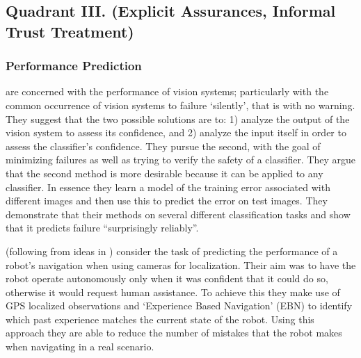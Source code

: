 \subsection{Quadrant III. (Explicit Assurances, Informal Trust Treatment)}\label{sec:q3}
\subsubsection{Performance Prediction}
    \citet{Zhang2014-he} are concerned with the performance of vision systems; particularly with the common occurrence of vision systems to failure `silently', that is with no warning. They suggest that the two possible solutions are to: 1) analyze the output of the vision system to assess its confidence, and 2) analyze the input itself in order to assess the classifier's confidence. They pursue the second, with the goal of minimizing failures as well as trying to verify the safety of a classifier. They argue that the second method is more desirable because it can be applied to any classifier. In essence they learn a model of the training error associated with different images and then use this to predict the error on test images. They demonstrate that their methods on several different classification tasks and show that it predicts failure ``surprisingly reliably''. 


    \citet{Gurau2016-hs} (following from ideas in \citet{Churchill2015-ei}) consider the task of predicting the performance of a robot's navigation when using cameras for localization. Their aim was to have the robot operate autonomously only when it was confident that it could do so, otherwise it would request human assistance. To achieve this they make use of GPS localized observations and `Experience Based Navigation' (EBN) to identify which past experience matches the current state of the robot. Using this approach they are able to reduce the number of mistakes that the robot makes when navigating in a real scenario. 

